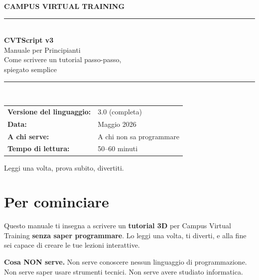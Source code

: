 ﻿\documentclass[a4paper,12pt,oneside]{book}
\begin{document}

\frontmatter
\pagestyle{plain}

\begin{titlepage}
  \pagecolor{cvtblue}\color{white}
  \vspace*{1.5cm}
  \begin{center}
    {\large\textsf{\textbf{CAMPUS VIRTUAL TRAINING}}}\\[0.4cm]
    \textcolor{white!60!cvtblue}{\rule{\textwidth}{0.6pt}}\\[2cm]
    {\fontsize{30}{36}\selectfont\textbf{CVTScript v3}}\\[0.5cm]
    {\fontsize{18}{22}\selectfont Manuale per Principianti}\\[0.3cm]
    {\fontsize{13}{16}\selectfont Come scrivere un tutorial passo-passo,\\spiegato semplice}\\[2.5cm]
    \textcolor{white!60!cvtblue}{\rule{\textwidth}{0.4pt}}\\[1cm]
    \begin{tabular}{@{}ll@{}}
      \textbf{Versione del linguaggio:} & 3.0 (completa) \\[5pt]
      \textbf{Data:}                    & Maggio 2026 \\[5pt]
      \textbf{A chi serve:}             & A chi non sa programmare \\[5pt]
      \textbf{Tempo di lettura:}        & 50--60 minuti
    \end{tabular}
  \end{center}
  \vfill
  \begin{center}
    {\footnotesize Leggi una volta, prova subito, divertiti.}
  \end{center}
\end{titlepage}
\pagecolor{white}\color{black}

\chapter*{Per cominciare}

Questo manuale ti insegna a scrivere un \textbf{tutorial 3D} per Campus Virtual Training
\textbf{senza saper programmare}. Lo leggi una volta, ti diverti, e alla fine sei
capace di creare le tue lezioni interattive.

\medskip
\textbf{Cosa NON serve.} Non serve conoscere nessun linguaggio di programmazione.
Non serve saper usare strumenti tecnici. Non serve avere studiato informatica.
\end{document}
